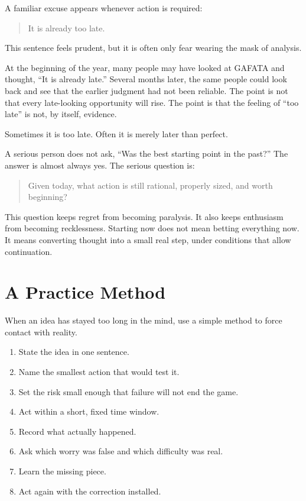 A familiar excuse appears whenever action is required:

\begin{quote}
It is already too late.
\end{quote}

This sentence feels prudent, but it is often only fear wearing the mask of analysis.

At the beginning of the year, many people may have looked at GAFATA and thought, ``It is already late.'' Several months later, the same people could look back and see that the earlier judgment had not been reliable. The point is not that every late-looking opportunity will rise. The point is that the feeling of ``too late'' is not, by itself, evidence.

Sometimes it is too late. Often it is merely later than perfect.

A serious person does not ask, ``Was the best starting point in the past?'' The answer is almost always yes. The serious question is:

\begin{quote}
Given today, what action is still rational, properly sized, and worth beginning?
\end{quote}

This question keeps regret from becoming paralysis. It also keeps enthusiasm from becoming recklessness. Starting now does not mean betting everything now. It means converting thought into a small real step, under conditions that allow continuation.

\section*{A Practice Method}

When an idea has stayed too long in the mind, use a simple method to force contact with reality.

\begin{enumerate}
\item State the idea in one sentence.
\item Name the smallest action that would test it.
\item Set the risk small enough that failure will not end the game.
\item Act within a short, fixed time window.
\item Record what actually happened.
\item Ask which worry was false and which difficulty was real.
\item Learn the missing piece.
\item Act again with the correction installed.
\end{enumerate}

